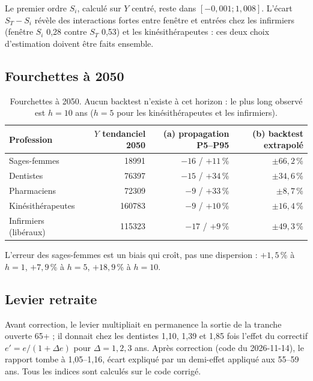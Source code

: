 Le premier ordre $S_i$, calculé sur $Y$ centré, reste dans $[-0{,}001 ; 1{,}008]$\mesure{}. L'écart
$S_T - S_i$ révèle des interactions fortes entre fenêtre et entrées chez les infirmiers (fenêtre $S_i$ 0,28 contre
$S_T$ 0,53\mesure{}) et les kinésithérapeutes : ces deux choix d'estimation doivent être faits ensemble.

\subsection{Fourchettes à 2050}
\begin{table}[h]\centering\small
\begin{tabular}{lrrr}
\toprule
Profession & $Y$ tendanciel 2050 & (a) propagation P5--P95 & (b) backtest extrapolé \\
\midrule
Sages-femmes & \num{18991}\mesure{} & $-16$ / $+11$\,\%\mesure{} & $\pm 66{,}2$\,\%\derive{} \\
Dentistes & \num{76397}\mesure{} & $-15$ / $+34$\,\%\mesure{} & $\pm 34{,}6$\,\%\derive{} \\
Pharmaciens & \num{72309}\mesure{} & $-9$ / $+33$\,\%\mesure{} & $\pm 8{,}7$\,\%\derive{} \\
Kinésithérapeutes & \num{160783}\mesure{} & $-9$ / $+10$\,\%\mesure{} & $\pm 16{,}4$\,\%\derive{} \\
Infirmiers (libéraux) & \num{115323}\mesure{} & $-17$ / $+9$\,\%\mesure{} & $\pm 49{,}3$\,\%\derive{} \\
\bottomrule
\end{tabular}
\caption{Fourchettes à 2050. Aucun backtest n'existe à cet horizon : le plus long observé est $h = 10$ ans
($h = 5$ pour les kinésithérapeutes et les infirmiers).}\label{a5-tab:band}
\end{table}

L'erreur des sages-femmes est un biais qui croît, pas une dispersion : $+1{,}5$\,\%\mesure{} à $h = 1$,
$+7{,}9$\,\%\mesure{} à $h = 5$, $+18{,}9$\,\%\mesure{} à $h = 10$.

\subsection{Levier retraite}
Avant correction, le levier multipliait en permanence la sortie de la tranche ouverte 65+ ; il donnait chez les
dentistes 1,10, 1,39 et 1,85\mesure{} fois l'effet du correctif $e' = e/(1+\Delta e)$ pour $\Delta = 1, 2, 3$ ans.
Après correction (code du 2026-11-14), le rapport tombe à 1,05--1,16\mesure{}, écart expliqué par un demi-effet
appliqué aux 55--59 ans. Tous les indices sont calculés sur le code corrigé.

